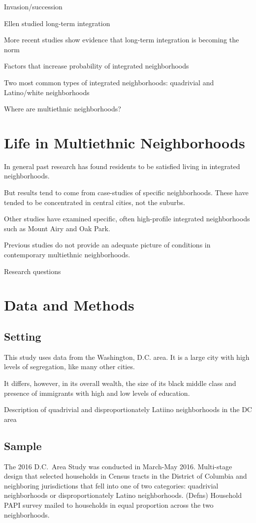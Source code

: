 \documentclass[11pt]{baderart}
\begin{document}
Invasion\slash succession

Ellen studied long-term integration

More recent studies show evidence that long-term integration is becoming the norm

Factors that increase probability of integrated neighborhoods

Two most common types of integrated neighborhoods: quadrivial and Latino\slash white neighborhoods

Where are multiethnic neighborhoods? 

\section{Life in Multiethnic Neighborhoods}

In general past research has found residents to be satisfied living in integrated neighborhoods.

But results tend to come from case-studies of specific neighborhoods. These have tended to be concentrated in central cities, not the suburbs.

Other studies have examined specific, often high-profile integrated neighborhoods such as Mount Airy and Oak Park. 

Previous studies do not provide an adequate picture of conditions in contemporary multiethnic neighborhoods. 

Research questions

\section{Data and Methods}
\subsection{Setting}
This study uses data from the Washington, D.C. area. It is a large city with high levels of segregation, like many other cities. 

It differs, however, in its overall wealth, the size of its black middle class and presence of immigrants with high and low levels of education. 

Description of quadrivial and disproportionately Latiino neighborhoods in the DC area

\subsection{Sample}
The 2016 D.C.\ Area Study was conducted in March-May 2016. Multi-stage design that selected households in Census tracts in the District of Columbia and neighboring jurisdictions that fell into one of two categories: quadrivial neighborhoods or disproportionately Latino neighborhoods. (Defns) Household PAPI survey mailed to households in equal proportion across the two neighborhoods. 
\end{document}
